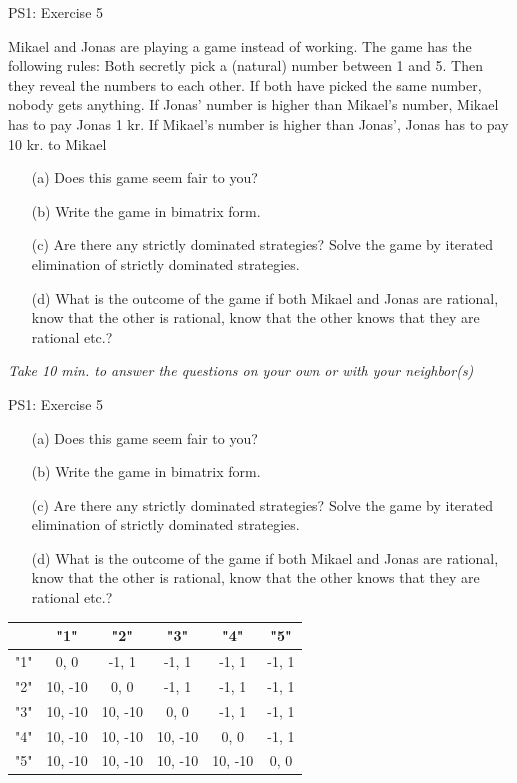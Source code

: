 \begin{frame}{PS1: Exercise 5}
\begin{multicols}{2}
  Mikael and Jonas are playing a game instead of working. The game has the following rules: Both secretly pick a (natural) number between 1 and 5. Then they reveal the numbers to each other. If both have picked the same number, nobody gets anything. If Jonas’ number is higher than Mikael’s number, Mikael has to pay Jonas 1 kr. If Mikael’s number is higher than Jonas’, Jonas has to pay 10 kr. to Mikael
\vfill\null \columnbreak
\begin{enumerate}
  \item[(a)] Does this game seem fair to you?
  \item[(b)] Write the game in bimatrix form.
  \item[(c)] Are there any strictly dominated strategies? Solve the game by iterated elimination of strictly dominated strategies.
  \item[(d)] What is the outcome of the game if both Mikael and Jonas are rational, know that the other is rational, know that the other knows that they are rational etc.?
\end{enumerate}
\vfill\null
\end{multicols}
\textit{Take 10 min. to answer the questions on your own or with your neighbor(s)}
\end{frame}

\begin{frame}{PS1: Exercise 5}
\begin{multicols}{2}
  \begin{enumerate}
    \item[(a)] Does this game seem fair to you?
    \item[(b)] Write the game in bimatrix form.
    \item[(c)] Are there any strictly dominated strategies? Solve the game by iterated elimination of strictly dominated strategies.
    \item[(d)] What is the outcome of the game if both Mikael and Jonas are rational, know that the other is rational, know that the other knows that they are rational etc.?
  \end{enumerate}
\vfill\null \columnbreak
\vfill\null
\begin{table}
  \footnotesize
  \begin{tabular}{c|c|c|c|c|c}
        & "1"     & "2"     & "3"     & "4"     & "5"     \\
    \midrule
    "1" & 0, 0    & -1, 1   & -1, 1   & -1, 1   & -1, 1   \\
    \midrule
    "2" & 10, -10 & 0, 0    & -1, 1   & -1, 1   & -1, 1   \\
    \midrule
    "3" & 10, -10 & 10, -10 & 0, 0    & -1, 1   & -1, 1   \\
    \midrule
    "4" & 10, -10 & 10, -10 & 10, -10 & 0, 0    & -1, 1   \\
    \midrule
    "5" & 10, -10 & 10, -10 & 10, -10 & 10, -10 & 0, 0    \\
  \end{tabular}
\end{table}
\end{multicols}
\end{frame}


